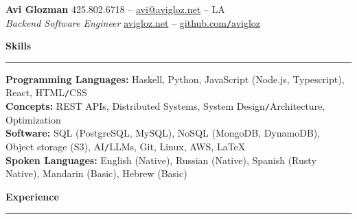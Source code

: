 \documentclass[10pt]{article}
\begin{document}
	\pagestyle{empty}
	\begin{center}
		{\huge \textbf{Avi Glozman}} {\large \hfill 425.802.6718 -- \href{mailto:avi@avigloz.net}{avi@avigloz.net} -- LA} \\
		{\large \textsl{Backend Software Engineer} \hfill \href{https://avigloz.net}{avigloz.net} -- \href{https://github.com/avigloz}{github.com\texttt{/}avigloz}}
	\end{center}
	
	\begin{flushleft}	
		\vspace{-0.5mm}
		{\large \raggedright \textbf{Skills}}
		\vspace{1.25mm}
	
		\hrule
	
		\vspace{2.25mm}
		\textbf{Programming Languages:} Haskell, Python, JavaScript (Node.js, Typescript), React, HTML\texttt{/}CSS\\
		\vspace{0.5mm}
		\textbf{Concepts:} REST APIs, Distributed Systems, System Design\texttt{/}Architecture, Optimization\\
		\vspace{0.5mm}
    \textbf{Software:} SQL (PostgreSQL, MySQL), NoSQL (MongoDB, DynamoDB), Object storage (S3), AI\texttt{/}LLMs, Git, Linux, AWS, \LaTeX\\ 
		\vspace{0.5mm}
		\textbf{Spoken Languages:} English (Native), Russian (Native), Spanish (Rusty Native), Mandarin (Basic), Hebrew (Basic) 

		\vspace{1.5mm}
		{\large \raggedright \textbf{Experience}}
		\vspace{1.25mm}
	
		\hrule

		\vspace{2.25mm}


\end{flushleft}
\end{document}
